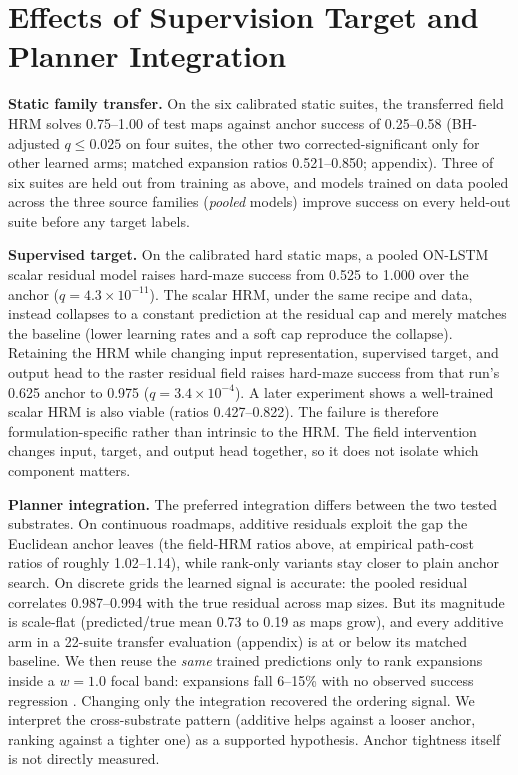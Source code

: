 \documentclass[letterpaper]{article} %
\begin{document}
\section{Effects of Supervision Target and Planner Integration}

\textbf{Static family transfer.} On the six calibrated static suites, the transferred field HRM solves 0.75--1.00 of test maps against anchor success of 0.25--0.58 (BH-adjusted $q \leq 0.025$ on four suites, the other two corrected-significant only for other learned arms; matched expansion ratios 0.521--0.850; appendix). Three of six suites are held out from training as above, and models trained on data pooled across the three source families (\emph{pooled} models) improve success on every held-out suite before any target labels.

\textbf{Supervised target.} On the calibrated hard static maps, a pooled ON-LSTM scalar residual model raises hard-maze success from 0.525 to 1.000 over the anchor ($q=4.3\times10^{-11}$). The scalar HRM, under the same recipe and data, instead collapses to a constant prediction at the residual cap and merely matches the baseline (lower learning rates and a soft cap reproduce the collapse). Retaining the HRM while changing input representation, supervised target, and output head to the raster residual field raises hard-maze success from that run's 0.625 anchor to 0.975 ($q=3.4\times10^{-4}$). A later experiment shows a well-trained scalar HRM is also viable (ratios 0.427--0.822). The failure is therefore formulation-specific rather than intrinsic to the HRM. The field intervention changes input, target, and output head together, so it does not isolate which component matters.

\textbf{Planner integration.} The preferred integration differs between the two tested substrates. On continuous roadmaps, additive residuals exploit the gap the Euclidean anchor leaves (the field-HRM ratios above, at empirical path-cost ratios of roughly 1.02--1.14), while rank-only variants stay closer to plain anchor search. On discrete grids the learned signal is accurate: the pooled residual correlates 0.987--0.994 with the true residual across map sizes. But its magnitude is scale-flat (predicted/true mean 0.73 to 0.19 as maps grow), and every additive arm in a 22-suite transfer evaluation (appendix) is at or below its matched baseline. We then reuse the \emph{same} trained predictions only to rank expansions inside a $w{=}1.0$ focal band: expansions fall 6--15\% with no observed success regression \citep{chrestien2023rank}. Changing only the integration recovered the ordering signal. We interpret the cross-substrate pattern (additive helps against a looser anchor, ranking against a tighter one) as a supported hypothesis. Anchor tightness itself is not directly measured.
\end{document}
